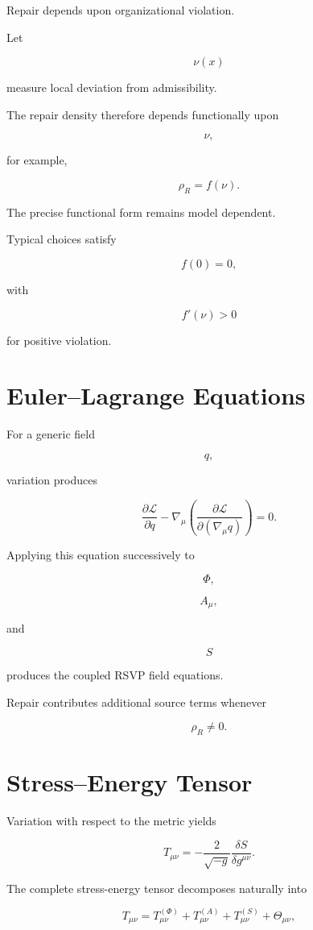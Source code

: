 \documentclass[11pt,oneside]{book}
\numberwithin{equation}{chapter}
\theoremstyle{definition}
\theoremstyle{plain}
\begin{document}
Repair depends upon organizational violation.

Let

\[
\nu(x)
\]

measure local deviation from admissibility.

The repair density therefore depends functionally upon

\[
\nu,
\]

for example,

\[
\rho_R
=
f(\nu).
\]

The precise functional form remains model dependent.

Typical choices satisfy

\[
f(0)
=
0,
\]

with

\[
f'(\nu)
>
0
\]

for positive violation.

\section{Euler--Lagrange Equations}

For a generic field

\[
q,
\]

variation produces

\[
\frac{\partial\mathcal L}
{\partial q}
-
\nabla_\mu
\left(
\frac{\partial\mathcal L}
{\partial(\nabla_\mu q)}
\right)
=
0.
\]

Applying this equation successively to

\[
\Phi,
\]

\[
A_\mu,
\]

and

\[
S
\]

produces the coupled RSVP field equations.

Repair contributes additional source terms whenever

\[
\rho_R
\neq
0.
\]

\section{Stress--Energy Tensor}

Variation with respect to the metric yields

\[
T_{\mu\nu}
=
-
\frac{2}{\sqrt{-g}}
\frac{\delta S}
{\delta g^{\mu\nu}}.
\]

The complete stress-energy tensor decomposes naturally into

\[
T_{\mu\nu}
=
T^{(\Phi)}_{\mu\nu}
+
T^{(A)}_{\mu\nu}
+
T^{(S)}_{\mu\nu}
+
\Theta_{\mu\nu},
\]
\end{document}

